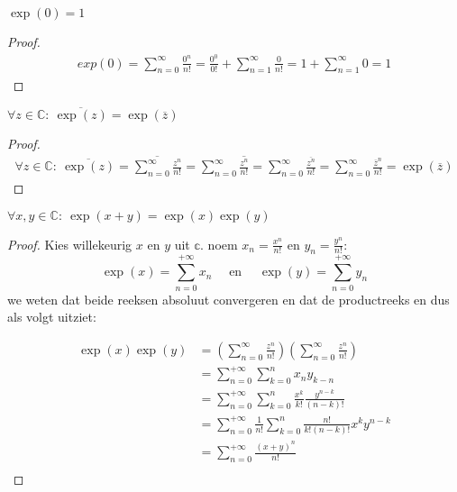 \documentclass[main.tex]{subfiles}
\begin{document}
\begin{bpr}
  \label{pr:epx-0-is-1}
    $\exp(0) = 1$
  \begin{proof}
    \begin{align*}
      exp(0)
      = \sum_{n=0}^{\infty}\frac{0^{n}}{n!}
      = \frac{0^{0}}{0!} + \sum_{n=1}^{\infty}\frac{0}{n!}
      = 1 + \sum_{n=1}^{\infty}0 = 1
    \end{align*}
  \end{proof}
\end{bpr}

\begin{bpr}
  \label{pr:exponent-toegevoegde}
  $\forall z \in \mathbb{C}:\ \overline{\exp(z)} = \exp(\overline{z})$

  \begin{proof}
    \begin{align*}
      \forall z \in \mathbb{C}:\ \overline{\exp(z)}
      = \overline{\sum_{n=0}^{\infty}\frac{z^{n}}{n!}}
      = \sum_{n=0}^{\infty}\overline{\frac{z^{n}}{n!}}
      = \sum_{n=0}^{\infty}\frac{\overline{z^{n}}}{n!}
      = \sum_{n=0}^{\infty}\frac{\overline{z}^{n}}{n!}
      = \exp(\overline{z})
    \end{align*}
  \end{proof}
\end{bpr}

\begin{pr}
  \label{pr:optelling-exp}
  $\forall x,y \in \mathbb{C}:\ \exp(x+y) = \exp(x)\exp(y)$

  \begin{proof}
    Kies willekeurig $x$ en $y$ uit $\mathbb{c}$.
    noem $x_{n} = \frac{x^{n}}{n!}$ en $y_{n} = \frac{y^{n}}{n!}$:
    \[ \exp(x) = \sum_{n=0}^{+\infty}x_{n} \quad\text{ en }\quad \exp(y) = \sum_{n=0}^{+\infty}y_{n} \]
    we weten dat beide reeksen absoluut convergeren en dat de productreeks en dus als volgt uitziet:
    
    \begin{align*}
      \exp(x)\exp(y)
      &= \left(\sum_{n=0}^{\infty}\frac{z^{n}}{n!}\right)\left(\sum_{n=0}^{\infty}\frac{z^{n}}{n!}\right)\\
      &= \sum_{n=0}^{+\infty}\sum_{k=0}^{n}x_{n}y_{k-n}\\
      &= \sum_{n=0}^{+\infty}\sum_{k=0}^{n}\frac{x^{k}}{k!}\frac{y^{n-k}}{(n-k)!}\\
      &= \sum_{n=0}^{+\infty}\frac{1}{n!}\sum_{k=0}^{n}\frac{n!}{k!(n-k)!}x^{k}y^{n-k}\\
      &= \sum_{n=0}^{+\infty}\frac{(x+y)^{n}}{n!}\\
    \end{align*}
  \end{proof}
\end{pr}
\end{document}
